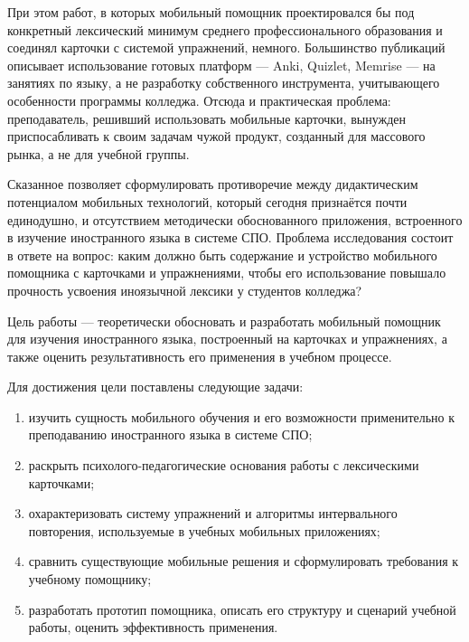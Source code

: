\documentclass[11pt,a4paper,openany]{report}
\begin{document}
При этом работ, в которых мобильный помощник проектировался бы под конкретный лексический минимум среднего профессионального образования и соединял карточки с системой упражнений, немного. Большинство публикаций описывает использование готовых платформ — Anki, Quizlet, Memrise — на занятиях по языку, а не разработку собственного инструмента, учитывающего особенности программы колледжа. Отсюда и практическая проблема: преподаватель, решивший использовать мобильные карточки, вынужден приспосабливать к своим задачам чужой продукт, созданный для массового рынка, а не для учебной группы.

Сказанное позволяет сформулировать противоречие между дидактическим потенциалом мобильных технологий, который сегодня признаётся почти единодушно, и отсутствием методически обоснованного приложения, встроенного в изучение иностранного языка в системе СПО. Проблема исследования состоит в ответе на вопрос: каким должно быть содержание и устройство мобильного помощника с карточками и упражнениями, чтобы его использование повышало прочность усвоения иноязычной лексики у студентов колледжа?

Цель работы — теоретически обосновать и разработать мобильный помощник для изучения иностранного языка, построенный на карточках и упражнениях, а также оценить результативность его применения в учебном процессе.

Для достижения цели поставлены следующие задачи:

\begin{enumerate}

  \item изучить сущность мобильного обучения и его возможности применительно к преподаванию иностранного языка в системе СПО;

  \item раскрыть психолого-педагогические основания работы с лексическими карточками;

  \item охарактеризовать систему упражнений и алгоритмы интервального повторения, используемые в учебных мобильных приложениях;

  \item сравнить существующие мобильные решения и сформулировать требования к учебному помощнику;

  \item разработать прототип помощника, описать его структуру и сценарий учебной работы, оценить эффективность применения.

\end{enumerate}
\end{document}

